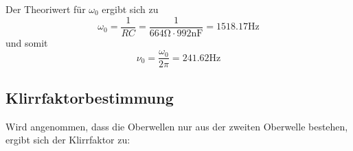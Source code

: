 Der Theoriwert für $\omega_0$ ergibt sich zu
\begin{equation*}
  \omega_0 = \frac{1}{RC} = \frac{1}{664\si{\ohm } \cdot 992\si{\nano\farad}}
  = 1518.17 \si{\hertz}
\end{equation*}
und somit
\begin{equation*}
  \nu_0 = \frac{\omega_0}{2\pi} = 241.62 \si{\hertz}
\end{equation*}

\subsection{Klirrfaktorbestimmung}

Wird angenommen, dass die Oberwellen nur aus der zweiten Oberwelle bestehen, ergibt
sich der Klirrfaktor zu:
